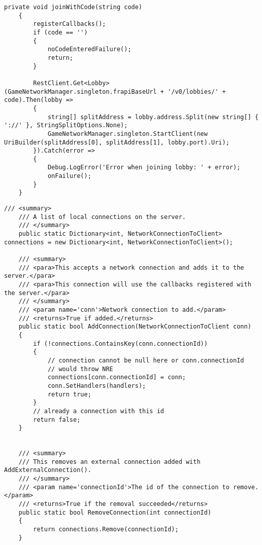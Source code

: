 \begin{lstlisting}[caption= ConnectionScript.cs joinWithCode()]
	private void joinWithCode(string code)
	{
		registerCallbacks();
		if (code == '')
		{
			noCodeEnteredFailure();
			return;
		}
		
		RestClient.Get<Lobby>(GameNetworkManager.singleton.frapiBaseUrl + '/v0/lobbies/' + code).Then(lobby =>
		{
			string[] splitAddress = lobby.address.Split(new string[] { '://' }, StringSplitOptions.None);
			GameNetworkManager.singleton.StartClient(new UriBuilder(splitAddress[0], splitAddress[1], lobby.port).Uri);
		}).Catch(error =>
		{
			Debug.LogError('Error when joining lobby: ' + error);
			onFailure();
		}
	}
\end{lstlisting}

\begin{lstlisting}[caption= Mirror Class NetworkServer.cs Connection Handling]
	/// <summary>
	/// A list of local connections on the server.
	/// </summary>
	public static Dictionary<int, NetworkConnectionToClient> connections = new Dictionary<int, NetworkConnectionToClient>();
	
	/// <summary>
	/// <para>This accepts a network connection and adds it to the server.</para>
	/// <para>This connection will use the callbacks registered with the server.</para>
	/// </summary>
	/// <param name='conn'>Network connection to add.</param>
	/// <returns>True if added.</returns>
	public static bool AddConnection(NetworkConnectionToClient conn)
	{
		if (!connections.ContainsKey(conn.connectionId))
		{
			// connection cannot be null here or conn.connectionId
			// would throw NRE
			connections[conn.connectionId] = conn;
			conn.SetHandlers(handlers);
			return true;
		}
		// already a connection with this id
		return false;
	}
	
	
	/// <summary>
	/// This removes an external connection added with AddExternalConnection().
	/// </summary>
	/// <param name='connectionId'>The id of the connection to remove.</param>
	/// <returns>True if the removal succeeded</returns>
	public static bool RemoveConnection(int connectionId)
	{
		return connections.Remove(connectionId);
	}
\end{lstlisting}

